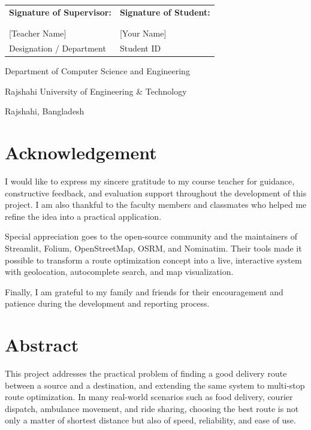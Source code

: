\begin{tabular}{p{}p{}}
\textbf{Signature of Supervisor:} & \textbf{Signature of Student:} \\
\rule{0pt}{1.25cm} & \rule{0pt}{1.25cm} \\
\hrulefill & \hrulefill \\
\textnormal{[Teacher Name]} & \textnormal{[Your Name]} \\
Designation / Department & \textnormal{Student ID} \\
\end{tabular}

\vfill
\begin{center}
Department of Computer Science and Engineering\par
Rajshahi University of Engineering \& Technology\par
Rajshahi, Bangladesh\par
\end{center}

\newpage
\section*{Acknowledgement}
I would like to express my sincere gratitude to my course teacher for guidance, constructive feedback, and evaluation support throughout the development of this project. I am also thankful to the faculty members and classmates who helped me refine the idea into a practical application.

Special appreciation goes to the open-source community and the maintainers of Streamlit, Folium, OpenStreetMap, OSRM, and Nominatim. Their tools made it possible to transform a route optimization concept into a live, interactive system with geolocation, autocomplete search, and map visualization.

Finally, I am grateful to my family and friends for their encouragement and patience during the development and reporting process.

\newpage
\section*{Abstract}
This project addresses the practical problem of finding a good delivery route between a source and a destination, and extending the same system to multi-stop route optimization. In many real-world scenarios such as food delivery, courier dispatch, ambulance movement, and ride sharing, choosing the best route is not only a matter of shortest distance but also of speed, reliability, and ease of use.

